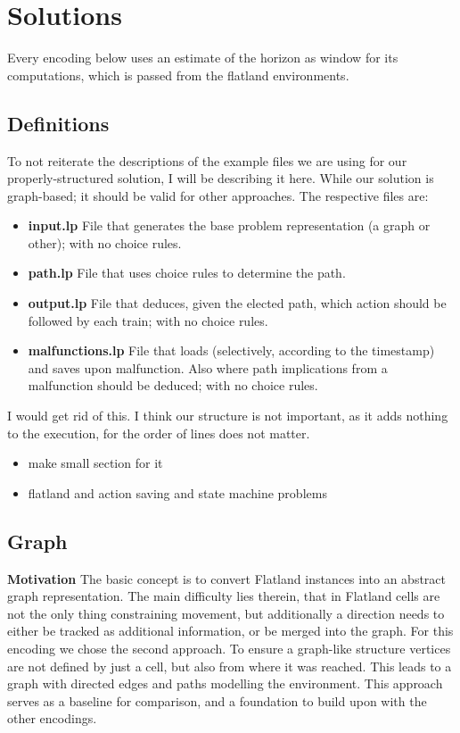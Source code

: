 
\section{Solutions}
Every encoding below uses an estimate of the horizon as window for its computations, which is passed from the flatland environments.
\color{green}
\subsection{Definitions}
To not reiterate the descriptions of the example files we are using for our properly-structured solution, I will be describing it here. While our solution is graph-based; it should be valid for other approaches. The respective files are:
\begin{itemize}
	\item  \textbf{input.lp} File that generates the base problem representation (a graph or other); with no choice rules.
	\item  \textbf{path.lp} File that uses choice rules to determine the path.
	\item  \textbf{output.lp} File that deduces, given the elected path, which action should be followed by each train; with no choice rules.
	\item  \textbf{malfunctions.lp} File that loads (selectively, according to the timestamp) and saves upon malfunction. Also where path implications from a malfunction should be deduced; with no choice rules.
\end{itemize}
\color{black} \color{gray} I would get rid of this. I think our structure is not important, as it adds nothing to the execution, for the order of lines does not matter. \color{black}
\color{blue}
\begin{itemize}
	\item make small section for it
	\item flatland and action saving and state machine problems
\end{itemize}
\color{black}


\subsection{Graph}
\noindent \textbf{Motivation} The basic concept is to convert Flatland instances into an abstract graph representation. The main difficulty lies therein, that in Flatland cells are not the only thing constraining movement, but additionally a direction needs to either be tracked as additional information, or be merged into the graph. For this encoding we chose the second approach. To ensure a graph-like structure vertices are not defined by just a cell, but also from where it was reached. This leads to a graph with directed edges and paths modelling the environment. This approach serves as a baseline for comparison, and a foundation to build upon with the other encodings.\\

